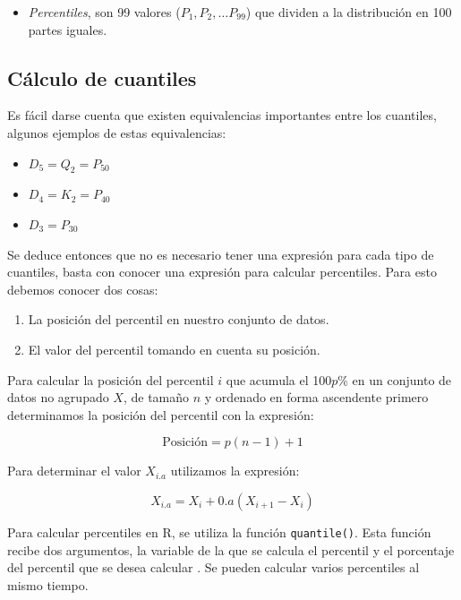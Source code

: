 \documentclass[
]{krantz}
\providecommand{\tightlist}{%
  \setlength{\itemsep}{0pt}\setlength{\parskip}{0pt}}
\begin{document}
\begin{itemize}
\tightlist
\item
  \emph{Percentiles}, son 99 valores (\(P_1, P_2, \ldots P_{99}\)) que dividen a la distribución en 100 partes iguales.
\end{itemize}

\hypertarget{calculo-de-cuantiles}{%
\subsection{Cálculo de cuantiles}\label{calculo-de-cuantiles}}

Es fácil darse cuenta que existen equivalencias importantes entre los cuantiles, algunos ejemplos de estas equivalencias:

\begin{itemize}
\tightlist
\item
  \(D_5=Q_2=P_{50}\)
\item
  \(D_4=K_2=P_{40}\)
\item
  \(D_3=P_{30}\)
\end{itemize}

Se deduce entonces que no es necesario tener una expresión para cada tipo de cuantiles, basta con conocer una expresión para calcular percentiles. Para esto debemos conocer dos cosas:

\begin{enumerate}
\def\labelenumi{\arabic{enumi}.}
\tightlist
\item
  La posición del percentil en nuestro conjunto de datos.
\item
  El valor del percentil tomando en cuenta su posición.
\end{enumerate}

Para calcular la posición del percentil \(i\) que acumula el 100\(p\)\% en un conjunto de datos no agrupado \(X\), de tamaño \(n\) y ordenado en forma ascendente primero determinamos la posición del percentil con la expresión:

\begin{equation} 
  \text{Posición} = p(n-1)+1
  \label{eq:posperc}
\end{equation}

Para determinar el valor \(X_{i.a}\) utilizamos la expresión:

\begin{equation} 
  X_{i.a}=X_{i}+0.a(X_{i+1}-X_{i})
  \label{eq:valperc}
\end{equation}

Para calcular percentiles en R, se utiliza la función \texttt{quantile()}. Esta función recibe dos argumentos, la variable de la que se calcula el percentil y el porcentaje del percentil que se desea calcular \citep{verzani2014}. Se pueden calcular varios percentiles al mismo tiempo.
\end{document}
